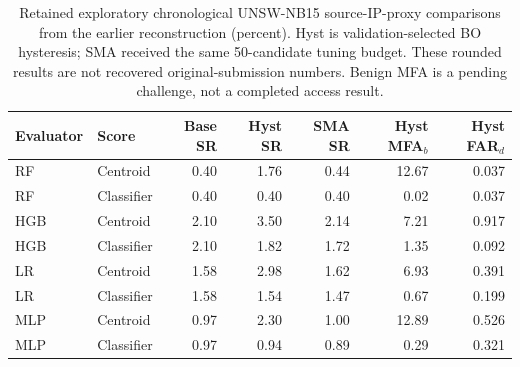 \begin{table}[!htbp]
\centering
\caption{Retained exploratory chronological UNSW-NB15 source-IP-proxy comparisons from the earlier reconstruction (percent). Hyst is validation-selected BO hysteresis; SMA received the same 50-candidate tuning budget. These rounded results are not recovered original-submission numbers. Benign MFA is a pending challenge, not a completed access result.}
\label{tab:supp_retained_evaluators}
\scriptsize
\setlength{\tabcolsep}{3pt}
\begin{tabular}{llrrrrr}
\toprule
Evaluator & Score & Base SR & Hyst SR & SMA SR & Hyst MFA$_b$ & Hyst FAR$_d$\\
\midrule
RF & Centroid & 0.40 & 1.76 & 0.44 & 12.67 & 0.037 \\
RF & Classifier & 0.40 & 0.40 & 0.40 & 0.02 & 0.037 \\
HGB & Centroid & 2.10 & 3.50 & 2.14 & 7.21 & 0.917 \\
HGB & Classifier & 2.10 & 1.82 & 1.72 & 1.35 & 0.092 \\
LR & Centroid & 1.58 & 2.98 & 1.62 & 6.93 & 0.391 \\
LR & Classifier & 1.58 & 1.54 & 1.47 & 0.67 & 0.199 \\
MLP & Centroid & 0.97 & 2.30 & 1.00 & 12.89 & 0.526 \\
MLP & Classifier & 0.97 & 0.94 & 0.89 & 0.29 & 0.321 \\
\bottomrule
\end{tabular}
\end{table}
